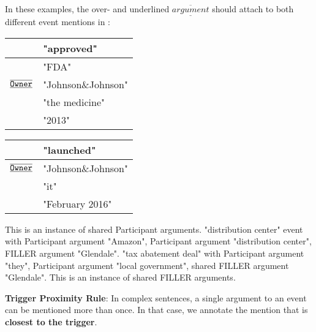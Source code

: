 In these examples, the over- and underlined $\overline{\underline{argument}}$ should attach to both different event mentions in :
\begin{samepage}
\begin{exe}
\ex {}
    \nopagebreak
        \expl \begin{tabular}{|L{6cm}|L{7cm}|} \hline
             & "approved" \\\hline
             & "FDA" \\
            $\overline{\underline{\texttt{Owner}}}$ & "Johnson\&Johnson" \\
             & "the medicine" \\
             & "2013" \\
            \hline \end{tabular}
        \expl \begin{tabular}{|L{6cm}|L{7cm}|} \hline
             & "launched" \\\hline
            $\overline{\underline{\texttt{Owner}}}$ & "Johnson\&Johnson" \\
             & "it" \\
             & "February 2016" \\\hline \end{tabular}
        \expl This is an instance of shared Participant arguments.
    \ex  {}
        \expl "distribution center"  event with  Participant argument "Amazon",  Participant argument "distribution center",  FILLER argument "Glendale".
        \expl "tax abatement deal"  with  Participant argument "they",  Participant argument "local government", shared  FILLER argument "Glendale".
        \expl This is an instance of shared FILLER arguments.
\end{exe}
\end{samepage}

\noindent
\textbf{Trigger Proximity Rule}:
In complex sentences, a single argument to an event can be mentioned more than once. 
In that case, we annotate the mention that is \textbf{closest to the trigger}.\\

